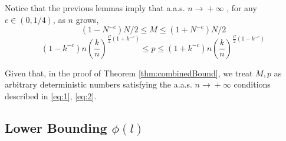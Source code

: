 \documentclass[12pt,reqno]{amsart}
\numberwithin{equation}{section}
\theoremstyle{definition}
\renewcommand{\epsilon}{\varepsilon}
\newcommand{\conv}[1]{\overset{#1}{\rightarrow}}
\newcommand{\Bi}[1]{\ensuremath{\text{Binomial}\left(#1\right)}}
\renewcommand{\[}{\begin{equation}}
\renewcommand{\]}{\end{equation}}
\renewcommand{\|}{\bigg{|}}
\newcommand{\maxwell}[1]{\textcolor{Goldenrod}{\;Max: #1}}
\newcommand{\kset}{random MAX k-set cover }
\newcommand{\ngrow}{\ensuremath{n \conv{} +\infty} }
\begin{document}
Notice that the previous lemmas imply that a.a.s. \ngrow, for any $c \in (0,1/4)$, as $n$ grows,
 \[(1-N^{-c})N/2 \leq M \leq (1+N^{-c})N/2 \label{eq:1} \]
 \[(1-k^{-c})n\left(\frac{k}{n}\right)^{\frac{C}{2}(1+k^{-c})}\leq p \leq (1+k^{-c})n\left(\frac{k}{n}\right)^{\frac{C}{2}(1-k^{-c})} \label{eq:2} \]

Given that, in the proof of Theorem \ref{thm:combinedBound}, we treat $M,p$ as arbitrary deterministic numbers satisfying the a.a.s. \ngrow conditions described in \eqref{eq:1}, \eqref{eq:2}.








\subsection{Lower Bounding $\phi(l)$}\label{subsec:Lower}
\end{document}
